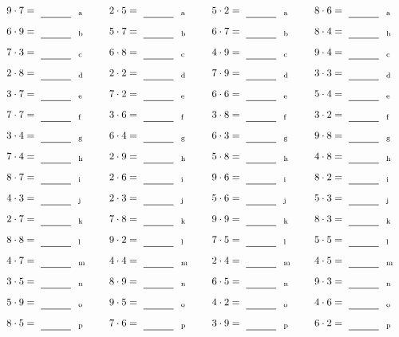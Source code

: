 \documentclass
[
  draft    = true,
  fontsize = 11pt,
  parskip  = half-
]
{scrartcl}
\begin{document}
\par\vfill\par
\begin{align*}
    \pline{9\cdot7}&=\rline{a}
  & \pline{2\cdot5}&=\rline{a}
  & \pline{5\cdot2}&=\rline{a}
  & \pline{8\cdot6}&=\rline{a} \\[1ex]
    \pline{6\cdot9}&=\rline{b}
  & \pline{5\cdot7}&=\rline{b}
  & \pline{6\cdot7}&=\rline{b}
  & \pline{8\cdot4}&=\rline{b} \\[1ex]
    \pline{7\cdot3}&=\rline{c}
  & \pline{6\cdot8}&=\rline{c}
  & \pline{4\cdot9}&=\rline{c}
  & \pline{9\cdot4}&=\rline{c} \\[1ex]
    \pline{2\cdot8}&=\rline{d}
  & \pline{2\cdot2}&=\rline{d}
  & \pline{7\cdot9}&=\rline{d}
  & \pline{3\cdot3}&=\rline{d} \\[1ex]
    \pline{3\cdot7}&=\rline{e}
  & \pline{7\cdot2}&=\rline{e}
  & \pline{6\cdot6}&=\rline{e}
  & \pline{5\cdot4}&=\rline{e} \\[1ex]
    \pline{7\cdot7}&=\rline{f}
  & \pline{3\cdot6}&=\rline{f}
  & \pline{3\cdot8}&=\rline{f}
  & \pline{3\cdot2}&=\rline{f} \\[1ex]
    \pline{3\cdot4}&=\rline{g}
  & \pline{6\cdot4}&=\rline{g}
  & \pline{6\cdot3}&=\rline{g}
  & \pline{9\cdot8}&=\rline{g} \\[1ex]
    \pline{7\cdot4}&=\rline{h}
  & \pline{2\cdot9}&=\rline{h}
  & \pline{5\cdot8}&=\rline{h}
  & \pline{4\cdot8}&=\rline{h} \\[1ex]
    \pline{8\cdot7}&=\rline{i}
  & \pline{2\cdot6}&=\rline{i}
  & \pline{9\cdot6}&=\rline{i}
  & \pline{8\cdot2}&=\rline{i} \\[1ex]
    \pline{4\cdot3}&=\rline{j}
  & \pline{2\cdot3}&=\rline{j}
  & \pline{5\cdot6}&=\rline{j}
  & \pline{5\cdot3}&=\rline{j} \\[1ex]
    \pline{2\cdot7}&=\rline{k}
  & \pline{7\cdot8}&=\rline{k}
  & \pline{9\cdot9}&=\rline{k}
  & \pline{8\cdot3}&=\rline{k} \\[1ex]
    \pline{8\cdot8}&=\rline{l}
  & \pline{9\cdot2}&=\rline{l}
  & \pline{7\cdot5}&=\rline{l}
  & \pline{5\cdot5}&=\rline{l} \\[1ex]
    \pline{4\cdot7}&=\rline{m}
  & \pline{4\cdot4}&=\rline{m}
  & \pline{2\cdot4}&=\rline{m}
  & \pline{4\cdot5}&=\rline{m} \\[1ex]
    \pline{3\cdot5}&=\rline{n}
  & \pline{8\cdot9}&=\rline{n}
  & \pline{6\cdot5}&=\rline{n}
  & \pline{9\cdot3}&=\rline{n} \\[1ex]
    \pline{5\cdot9}&=\rline{o}
  & \pline{9\cdot5}&=\rline{o}
  & \pline{4\cdot2}&=\rline{o}
  & \pline{4\cdot6}&=\rline{o} \\[1ex]
    \pline{8\cdot5}&=\rline{p}
  & \pline{7\cdot6}&=\rline{p}
  & \pline{3\cdot9}&=\rline{p}
  & \pline{6\cdot2}&=\rline{p}
\end{align*}
\end{document}
